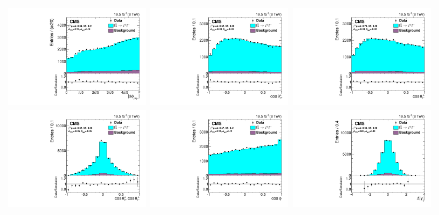 \begin{figure}[phtb]
  \centering
  \includegraphics[width=0.325\textwidth]{figures/dataMC_lep_azimuthal_asymmetry2_combined.pdf}
  \includegraphics[width=0.325\textwidth]{figures/dataMC_lepPlus_costheta_cms_combined.pdf}
  \includegraphics[width=0.325\textwidth]{figures/dataMC_lepMinus_costheta_cms_combined.pdf}
  \includegraphics[width=0.325\textwidth]{figures/dataMC_top_spin_correlation_combined.pdf}
  \includegraphics[width=0.325\textwidth]{figures/dataMC_lep_cos_opening_angle_combined.pdf}
  \includegraphics[width=0.325\textwidth]{figures/dataMC_top_rapiditydiff_Marco_combined.pdf}

\end{figure}
